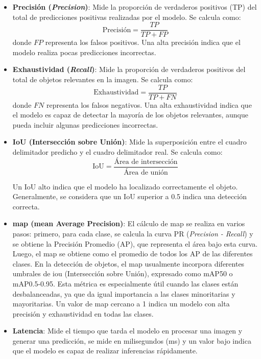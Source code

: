 \documentclass[11pt,spanish,listoffigures,listoftables]{tfgetsinf}
\begin{document}
\begin{itemize}
   \item {\textbf{Precisión (\textit{Precision})}}: Mide la proporción de verdaderos positivos (TP) del total de predicciones positivas realizadas por el modelo. Se calcula como:
   \[
   \text{Precisión} = \frac{TP}{TP + FP}
   \]
   donde $FP$ representa los falsos positivos. Una alta precisión indica que el modelo realiza pocas predicciones incorrectas.

   \item \textbf{Exhaustividad (\textit{Recall})}: Mide la proporción de verdaderos positivos del total de objetos relevantes en la imagen. Se calcula como:
   \[
   \text{Exhaustividad} = \frac{TP}{TP + FN}
   \]
   donde $FN$ representa los falsos negativos. Una alta exhaustividad indica que el modelo es capaz de detectar la mayoría de los objetos relevantes, aunque pueda incluir algunas predicciones incorrectas.

   \item \textbf{IoU (Intersección sobre Unión)}: Mide la superposición entre el cuadro delimitador predicho y el cuadro delimitador real. Se calcula como:
   \[
   \text{IoU} = \frac{\text{Área de intersección}}{\text{Área de unión}}
   \]

   Un IoU alto indica que el modelo ha localizado correctamente el objeto. Generalmente, se considera que un IoU superior a 0.5 indica una detección correcta.
   \item \textbf{\gls{map} (mean Average Precision)}: El cálculo de \gls{map} se realiza en varios pasos: primero, para cada clase, se calcula la curva PR (\textit{Precision - Recall}) y se obtiene la Precisión Promedio (AP), que representa el área bajo esta curva. Luego, el \gls{map} se obtiene como el promedio de todos los AP de las diferentes clases. En la detección de objetos, el \gls{map} usualmente incorpora diferentes umbrales de \gls{iou} (Intersección sobre Unión), expresado como mAP50 o mAP0.5-0.95. Esta métrica es especialmente útil cuando las clases están desbalanceadas, ya que da igual importancia a las clases minoritarias y mayoritarias. Un valor de \gls{map} cercano a 1 indica un modelo con alta precisión y exhaustividad en todas las clases.

   \item \textbf{Latencia}: Mide el tiempo que tarda el modelo en procesar una imagen y generar una predicción, se mide en milisegundos (ms) y un valor bajo indica que el modelo es capaz de realizar inferencias rápidamente.


\end{itemize}
\end{document}
